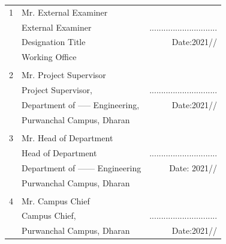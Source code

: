\documentclass[a4paper, 12pt ]{report}
\begin{document}
	{\normalsize
	\begin{flushright}
		\begin{tabular}{llr}
			1 & Mr. External Examiner                      &                         \\
		& External Examiner                & \hspace{120pt} ............................. \\
		& Designation Title                & Date:2021/\hspace{15pt}/\hspace{15pt}          \\
		& Working Office                   &                         \\
		&                                  &                         \\
		2 & Mr. Project Supervisor                       &                         \\
		& Project Supervisor,              &\hspace{120pt} ............................. \\
		& Department of ----- Engineering, & Date:2021/\hspace{15pt}/\hspace{15pt}           \\
		& Purwanchal Campus, Dharan        &                         \\
		&                                  &                         \\
		3 & Mr. Head of Department                         &                         \\
		& Head of Department               &\hspace{120pt} ............................. \\
		& Department of ------ Engineering & Date: 2021/\hspace{15pt}/\hspace{15pt}  \\
		& Purwanchal Campus, Dharan        &                         \\
		&                                  &                         \\
		4 & Mr. Campus Chief                         &                         \\
		& Campus Chief,                    & \hspace{120pt} ............................. \\
		& Purwanchal Campus, Dharan        & Date:2021/\hspace{15pt}/\hspace{15pt}      
	\end{tabular}
	\end{flushright}	
	}
\end{document}
